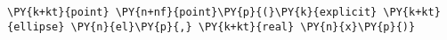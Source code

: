 \begin{Verbatim}[commandchars=\\\{\}]
    \PY{k+kt}{point} \PY{n+nf}{point}\PY{p}{(}\PY{k}{explicit} \PY{k+kt}{ellipse} \PY{n}{el}\PY{p}{,} \PY{k+kt}{real} \PY{n}{x}\PY{p}{)}
\end{Verbatim}
